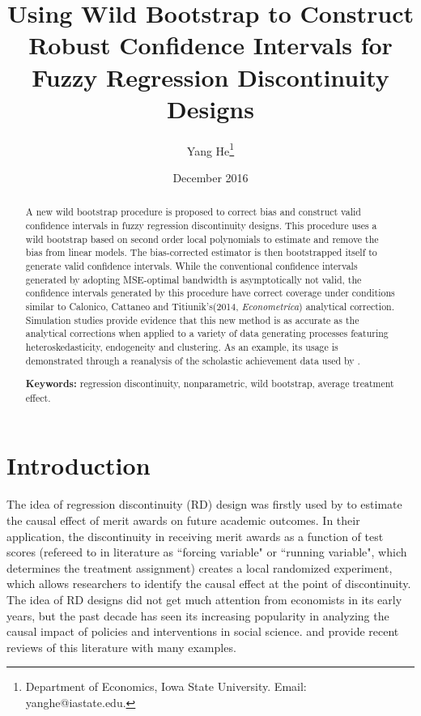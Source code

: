 \documentclass[12pt,]{article}
\DeclareMathOperator{\1}{\mathbbm{1}}
\begin{document}
\title{Using Wild Bootstrap to Construct Robust Confidence Intervals for Fuzzy Regression Discontinuity Designs}
\author{Yang He\thanks{Department of Economics, Iowa State University. Email: yanghe@iastate.edu.}}
\date{December 2016}
\maketitle

\begin{abstract}\noindent
A new wild bootstrap procedure is proposed to correct bias and construct valid confidence intervals in fuzzy regression discontinuity designs. This procedure uses a wild bootstrap based on second order local polynomials to estimate and remove the bias from linear models. The bias-corrected estimator is then bootstrapped itself to generate valid confidence intervals. While the conventional confidence intervals generated by adopting MSE-optimal bandwidth is asymptotically not valid, the confidence intervals generated by this procedure have correct coverage under conditions similar to Calonico, Cattaneo and Titiunik's(2014, \textit{Econometrica}) analytical correction. Simulation studies provide evidence that this new method is as accurate as the analytical corrections when applied to a variety of data generating processes featuring heteroskedasticity, endogeneity and clustering. As an example, its usage is demonstrated through a reanalysis of the scholastic achievement data used by \cite{angrist1999using}.

{\bf Keywords:} regression discontinuity, nonparametric, wild bootstrap, average treatment effect.
\end{abstract}

\section{Introduction}
The idea of regression discontinuity (RD) design was firstly used by \cite{thistlethwaite1960regression} to estimate the causal effect of merit awards on future academic outcomes. In their application, the discontinuity in receiving merit awards as a function of test scores (refereed to in literature as ``forcing variable" or ``running variable", which determines the treatment assignment) creates a local randomized experiment, which allows researchers to identify the causal effect at the point of discontinuity. The idea of RD designs did not get much attention from economists in its early years, but the past decade has seen its increasing popularity in analyzing the causal impact of policies and interventions in social science. \cite{imbens2008regression} and \cite{lee2010regression} provide recent reviews of this literature with many examples.
\end{document}
